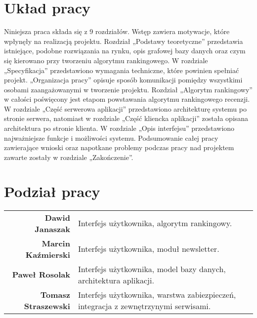 \section{Układ pracy}
Niniejsza praca składa się z 9 rozdziałów. Wstęp zawiera motywacje, które wpłynęły na realizacją projektu. Rozdział „Podstawy teoretyczne” przedstawia istniejące, podobne rozwiązania na rynku, opis grafowej bazy danych oraz czym się kierowano przy tworzeniu algorytmu rankingowego. W rozdziale „Specyfikacja” przedstawiono wymagania techniczne, które powinien spełniać projekt. „Organizacja pracy” opisuje sposób komunikacji pomiędzy wszystkimi osobami zaangażowanymi w tworzenie projektu.  Rozdział „Algorytm rankingowy” w całości poświęcony jest etapom powstawania algorytmu rankingowego recenzji. W rozdziale „Część serwerowa aplikacji” przedstawiono architekturę systemu po stronie serwera, natomiast w rozdziale „Część kliencka aplikacji” została opisana architektura po stronie klienta. W rozdziale „Opis interfejsu” przedstawiono najważniejsze funkcje i możliwości systemu. Podsumowanie całej pracy zawierające wnioski oraz napotkane problemy podczas pracy nad projektem zawarte zostały w rozdziale „Zakończenie”.


\section{Podział pracy}
\noindent\begin{tabular}{rp{9cm}}
\textbf{Dawid Janaszak} & Interfejs użytkownika, algorytm rankingowy.\\

\textbf{Marcin Kaźmierski} & Interfejs użytkownika, moduł newsletter.\\

\textbf{Paweł Rosolak} & Interfejs użytkownika, model bazy danych, architektura aplikacji.\\

\textbf{Tomasz Straszewski} & Interfejs użytkownika, warstwa zabiezpieczeń, integracja z zewnętrzynymi serwisami.\\
\end{tabular}


